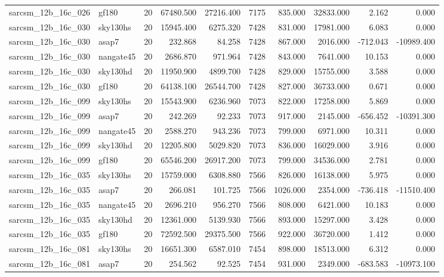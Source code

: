 \begin{longtable}{llrrrrrrrr}
sarcsm\_12b\_16c\_026 & gf180 & 20 & 67480.500 & 27216.400 & 7175 & 835.000 & 32833.000 & 2.162 & 0.000 \\
sarcsm\_12b\_16c\_030 & sky130hs & 20 & 15945.400 & 6275.320 & 7428 & 831.000 & 17981.000 & 6.083 & 0.000 \\
sarcsm\_12b\_16c\_030 & asap7 & 20 & 232.868 & 84.258 & 7428 & 867.000 & 2016.000 & -712.043 & -10989.400 \\
sarcsm\_12b\_16c\_030 & nangate45 & 20 & 2686.870 & 971.964 & 7428 & 843.000 & 7641.000 & 10.153 & 0.000 \\
sarcsm\_12b\_16c\_030 & sky130hd & 20 & 11950.900 & 4899.700 & 7428 & 829.000 & 15755.000 & 3.588 & 0.000 \\
sarcsm\_12b\_16c\_030 & gf180 & 20 & 64138.100 & 26544.700 & 7428 & 827.000 & 36733.000 & 0.671 & 0.000 \\
sarcsm\_12b\_16c\_099 & sky130hs & 20 & 15543.900 & 6236.960 & 7073 & 822.000 & 17258.000 & 5.869 & 0.000 \\
sarcsm\_12b\_16c\_099 & asap7 & 20 & 242.269 & 92.233 & 7073 & 917.000 & 2145.000 & -656.452 & -10391.300 \\
sarcsm\_12b\_16c\_099 & nangate45 & 20 & 2588.270 & 943.236 & 7073 & 799.000 & 6971.000 & 10.311 & 0.000 \\
sarcsm\_12b\_16c\_099 & sky130hd & 20 & 12205.800 & 5029.820 & 7073 & 836.000 & 16029.000 & 3.916 & 0.000 \\
sarcsm\_12b\_16c\_099 & gf180 & 20 & 65546.200 & 26917.200 & 7073 & 799.000 & 34536.000 & 2.781 & 0.000 \\
sarcsm\_12b\_16c\_035 & sky130hs & 20 & 15759.000 & 6308.880 & 7566 & 826.000 & 16138.000 & 5.975 & 0.000 \\
sarcsm\_12b\_16c\_035 & asap7 & 20 & 266.081 & 101.725 & 7566 & 1026.000 & 2354.000 & -736.418 & -11510.400 \\
sarcsm\_12b\_16c\_035 & nangate45 & 20 & 2696.210 & 956.270 & 7566 & 808.000 & 6421.000 & 10.183 & 0.000 \\
sarcsm\_12b\_16c\_035 & sky130hd & 20 & 12361.000 & 5139.930 & 7566 & 893.000 & 15297.000 & 3.428 & 0.000 \\
sarcsm\_12b\_16c\_035 & gf180 & 20 & 72592.500 & 29375.500 & 7566 & 922.000 & 36720.000 & 1.412 & 0.000 \\
sarcsm\_12b\_16c\_081 & sky130hs & 20 & 16651.300 & 6587.010 & 7454 & 898.000 & 18513.000 & 6.312 & 0.000 \\
sarcsm\_12b\_16c\_081 & asap7 & 20 & 254.562 & 92.525 & 7454 & 931.000 & 2349.000 & -683.583 & -10973.100 \\

\end{longtable}
